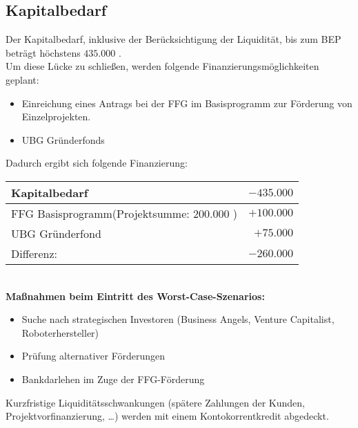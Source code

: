 \subsection{Kapitalbedarf}
Der Kapitalbedarf, inklusive der Berücksichtigung der Liquidität, bis zum BEP beträgt höchstens $435.000$ \officialeuro.\\
Um diese Lücke zu schließen, werden folgende Finanzierungsmöglichkeiten geplant:
\begin{itemize}
	\item Einreichung eines Antrags bei der FFG im Basisprogramm zur Förderung von Einzelprojekten.
	\item UBG Gründerfonds
\end{itemize}
Dadurch ergibt sich folgende Finanzierung:\\
\begin{tabular}{l r}
	Kapitalbedarf & $-435.000$ \officialeuro \\
	\hline
	FFG Basisprogramm(Projektsumme: $200.000$ \officialeuro) & $+100.000$ \officialeuro \\
	UBG Gründerfond & $+75.000$ \officialeuro \\
	\bottomrule
	Differenz: & $-260.000$ \officialeuro
\end{tabular}\\

\textbf{Maßnahmen beim Eintritt des Worst-Case-Szenarios:}
\begin{itemize}
	\item Suche nach strategischen Investoren (Business Angels, Venture Capitalist, Roboterhersteller)
	\item Prüfung alternativer Förderungen
	\item Bankdarlehen im Zuge der FFG-Förderung
\end{itemize}
Kurzfristige Liquiditätsschwankungen (spätere Zahlungen der Kunden, Projektvorfinanzierung, …) werden mit einem Kontokorrentkredit abgedeckt.
